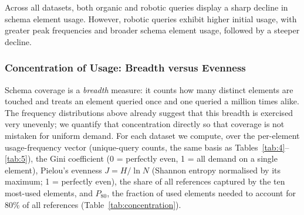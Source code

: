 \documentclass[sw]{iosart2x}
\begin{document}
Across all datasets, both organic and robotic queries display a sharp decline in schema element usage. However, robotic queries exhibit higher initial usage, with greater peak frequencies and broader schema element usage, followed by a steeper decline.

\subsubsection{Concentration of Usage: Breadth versus Evenness}\label{sec:concentration}
Schema coverage is a \emph{breadth} measure: it counts how many distinct elements are touched and treats an element queried once and one queried a million times alike. The frequency distributions above already suggest that this breadth is exercised very unevenly; we quantify that concentration directly so that coverage is not mistaken for uniform demand. For each dataset we compute, over the per-element usage-frequency vector (unique-query counts, the same basis as Tables~\ref{tab:4}--\ref{tab:5}), the Gini coefficient (0 = perfectly even, 1 = all demand on a single element), Pielou's evenness $J = H/\ln N$ (Shannon entropy normalised by its maximum; 1 = perfectly even), the share of all references captured by the ten most-used elements, and $P_{80}$, the fraction of used elements needed to account for 80\% of all references (Table~\ref{tab:concentration}).
\end{document}
